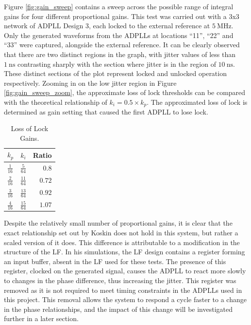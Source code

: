 Figure \ref{fig:gain_sweep} contains a sweep across the possible range of integral gains for four different proportional gains. This test was carried out with a 3x3 network of \ac{ADPLL} Design 3, each locked to the external reference at $5~\si{\mega\hertz}$. Only the generated waveforms from the \acp{ADPLL} at locations ``11'', ``22'' and  ``33'' were captured, alongside the external reference. It can be clearly observed that there are two distinct regions in the graph, with jitter values of less than $1~\si{\nano\second}$ contrasting sharply with the section where jitter is in the region of $10~\si{\nano\second}$. These distinct sections of the plot represent locked and unlocked operation respectively. Zooming in on the low jitter region in Figure \ref{fig:gain_sweep_zoom}, the approximate loss of lock thresholds can be compared with the theoretical relationship of $k_i = 0.5\times k_p$. The approximated loss of lock is determined as gain setting that caused the first \ac{ADPLL} to lose lock.
\begin{table}[!h]
    \begin{center}
        \begin{tabular}{lrr}
            \multicolumn{1}{c}{$k_p$} & \multicolumn{1}{c}{$k_i$} & \multicolumn{1}{c}{Ratio} \T\B\\
            \hline
            $\frac{1}{16}$            & $\frac{5}{64}$            & $0.8$ \T\B\\
            $\frac{2}{16}$            & $\frac{11}{64}$           & $0.72$ \T\B\\
            $\frac{3}{16}$            & $\frac{13}{64}$           & $0.92$ \T\B\\
            $\frac{4}{16}$            & $\frac{15}{64}$           & $1.07$ \T\B
        \end{tabular}
    \end{center}
    \vspace{-0.5cm}
    \caption[Loss of Lock Gains]{Loss of Lock Gains.}
    \label{table:lolgains}
\end{table}

Despite the relatively small number of proportional gains, it is clear that the exact relationship set out by Koskin does not hold in this system, but rather a scaled version of it does.  This difference is attributable to a modification in the structure of the \ac{LF}. In his simulations, the \ac{LF} design contains a register forming an input buffer, absent in the \ac{LF} used for these tests. The presence of this register, clocked on the generated signal, causes the \ac{ADPLL} to react more slowly to changes in the phase difference, thus increasing the jitter. This register was removed as it is not required to meet timing constraints in the \acp{ADPLL} used in this project. This removal allows the system to respond a cycle faster to a change in the phase relationships, and the impact of this change will be investigated further in a later section.

